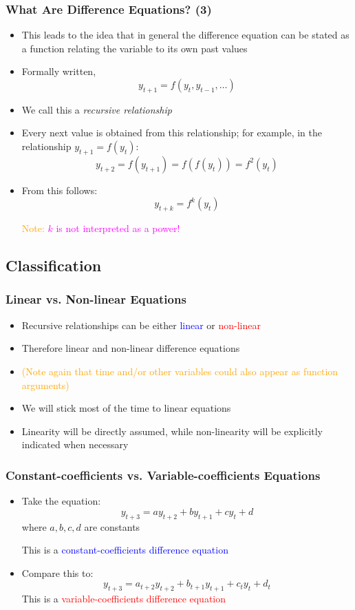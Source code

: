 \documentclass[10pt,usenames,dvipsnames]{beamer}
\theoremstyle{definition}
\begin{document}
\begin{frame}[fragile]
\frametitle{What Are Difference Equations? (3)}
\begin{itemize}
	\item This leads to the idea that in general the difference equation can be stated as a function relating the variable to its own past values
	\item Formally written,
	\[
		y_{t+1} = f(y_{t},y_{t-1},\ldots)
	\]
	\item We call this a \emph{recursive relationship}
	\item Every next value is obtained from this relationship; for example, in the relationship $y_{t+1} = f(y_{t})$:
	\[
		y_{t+2} = f(y_{t+1}) = f(f(y_{t})) = f^{2}(y_{t})
	\]
	\item From this follows:
	\[
		y_{t+k} = f^{k}(y_{t})
	\]
	
	\textcolor{orange}{Note: }\textcolor{magenta}{$k$ is not interpreted as a power!}
	
\end{itemize}
\end{frame}

\subsection{Classification}
\begin{frame}[fragile]
\frametitle{Linear vs. Non-linear Equations}
\begin{itemize}
	\item Recursive relationships can be either \textcolor{blue}{linear} or \textcolor{red}{non-linear}
	\item Therefore linear and non-linear difference equations
	\item \textcolor{orange}{(Note again that time and/or other variables could also appear as function arguments)}
	\item We will stick most of the time to linear equations
	\item Linearity will be directly assumed, while non-linearity will be explicitly indicated when necessary 
\end{itemize}
\end{frame}

\begin{frame}[fragile]
\frametitle{Constant-coefficients vs. Variable-coefficients Equations}
\begin{itemize}
	\item Take the equation: 
	\[
		y_{t+3} = ay_{t+2} + by_{t+1} + cy_{t} + d
	\]
	where $a,b,c,d$ are constants

	This is a \textcolor{blue}{constant-coefficients difference equation}
	
	\item Compare this to: 
	\[
		y_{t+3} = a_{t+2}y_{t+2} + b_{t+1}y_{t+1} + c_{t}y_{t} + d_{t}
	\]
	This is a \textcolor{red}{variable-coefficients difference equation}
\end{itemize}
\end{frame}
\end{document}
